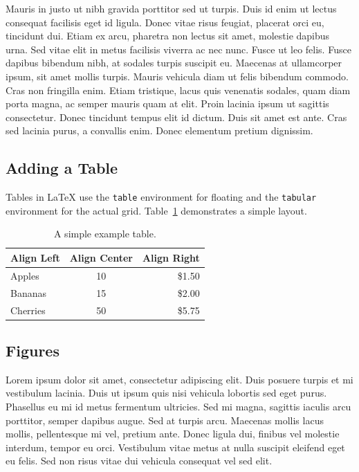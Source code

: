 \documentclass[
  digital,     %
  oneside,     %
  nosansbold,  %
  nocolorbold, %
  lof,         %
  lot,         %
]{fithesis4}
\begin{document}
Mauris in justo ut nibh gravida porttitor sed ut turpis. Duis id enim ut lectus consequat facilisis eget id ligula. Donec vitae risus feugiat, placerat orci eu, tincidunt dui. Etiam ex arcu, pharetra non lectus sit amet, molestie dapibus urna. Sed vitae elit in metus facilisis viverra ac nec nunc. Fusce ut leo felis. Fusce dapibus bibendum nibh, at sodales turpis suscipit eu. Maecenas at ullamcorper ipsum, sit amet mollis turpis. Mauris vehicula diam ut felis bibendum commodo. Cras non fringilla enim. Etiam tristique, lacus quis venenatis sodales, quam diam porta magna, ac semper mauris quam at elit. Proin lacinia ipsum ut sagittis consectetur. Donec tincidunt tempus elit id dictum. Duis sit amet est ante. Cras sed lacinia purus, a convallis enim. Donec elementum pretium dignissim.

\subsection{Adding a Table}
Tables in LaTeX use the \texttt{table} environment for floating and the \texttt{tabular} environment for the actual grid. Table~\ref{tab:example} demonstrates a simple layout.

\begin{table}[ht]
    \centering
    \caption{A simple example table.}
    \vspace{0.2cm}
    \begin{tabular}{|l|c|r|}
        \hline
        \textbf{Align Left} & \textbf{Align Center} & \textbf{Align Right} \\
        \hline
        Apples & 10 & \$1.50 \\
        Bananas & 15 & \$2.00 \\
        Cherries & 50 & \$5.75 \\
        \hline
    \end{tabular}
    \label{tab:example}
\end{table}

\subsection{Figures}
Lorem ipsum dolor sit amet, consectetur adipiscing elit. Duis posuere turpis et mi vestibulum lacinia. Duis ut ipsum quis nisi vehicula lobortis sed eget purus. Phasellus eu mi id metus fermentum ultricies. Sed mi magna, sagittis iaculis arcu porttitor, semper dapibus augue. Sed at turpis arcu. Maecenas mollis lacus mollis, pellentesque mi vel, pretium ante. Donec ligula dui, finibus vel molestie interdum, tempor eu orci. Vestibulum vitae metus at nulla suscipit eleifend eget eu felis. Sed non risus vitae dui vehicula consequat vel sed elit.
\end{document}
